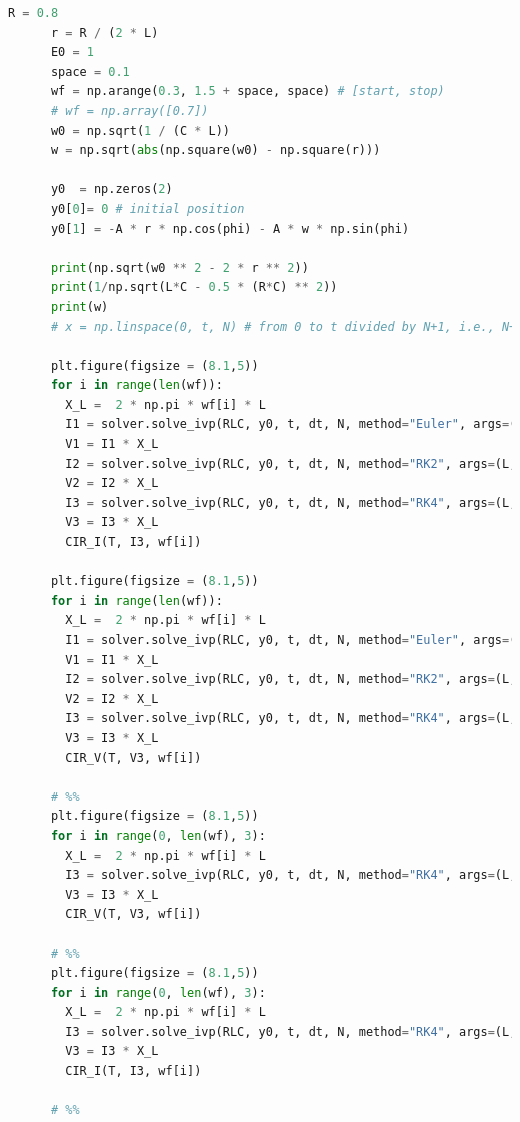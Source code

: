 \documentclass[12pt]{article}
\begin{document}
\begin{lstlisting}[language={Python}]
      R = 0.8
      r = R / (2 * L)
      E0 = 1
      space = 0.1
      wf = np.arange(0.3, 1.5 + space, space) # [start, stop)
      # wf = np.array([0.7])
      w0 = np.sqrt(1 / (C * L))
      w = np.sqrt(abs(np.square(w0) - np.square(r)))

      y0  = np.zeros(2)
      y0[0]= 0 # initial position
      y0[1] = -A * r * np.cos(phi) - A * w * np.sin(phi)

      print(np.sqrt(w0 ** 2 - 2 * r ** 2))
      print(1/np.sqrt(L*C - 0.5 * (R*C) ** 2))
      print(w)
      # x = np.linspace(0, t, N) # from 0 to t divided by N+1, i.e., N+1 equal parts.

      plt.figure(figsize = (8.1,5))
      for i in range(len(wf)):
        X_L =  2 * np.pi * wf[i] * L
        I1 = solver.solve_ivp(RLC, y0, t, dt, N, method="Euler", args=(L, R, C, wf[i], E0))[1]
        V1 = I1 * X_L
        I2 = solver.solve_ivp(RLC, y0, t, dt, N, method="RK2", args=(L, R, C, wf[i], E0))[1]
        V2 = I2 * X_L
        I3 = solver.solve_ivp(RLC, y0, t, dt, N, method="RK4", args=(L, R, C, wf[i], E0))[1]
        V3 = I3 * X_L
        CIR_I(T, I3, wf[i])
        
      plt.figure(figsize = (8.1,5))
      for i in range(len(wf)):
        X_L =  2 * np.pi * wf[i] * L
        I1 = solver.solve_ivp(RLC, y0, t, dt, N, method="Euler", args=(L, R, C, wf[i], E0))[1]
        V1 = I1 * X_L
        I2 = solver.solve_ivp(RLC, y0, t, dt, N, method="RK2", args=(L, R, C, wf[i], E0))[1]
        V2 = I2 * X_L
        I3 = solver.solve_ivp(RLC, y0, t, dt, N, method="RK4", args=(L, R, C, wf[i], E0))[1]
        V3 = I3 * X_L
        CIR_V(T, V3, wf[i])

      # %%
      plt.figure(figsize = (8.1,5))
      for i in range(0, len(wf), 3):
        X_L =  2 * np.pi * wf[i] * L
        I3 = solver.solve_ivp(RLC, y0, t, dt, N, method="RK4", args=(L, R, C, wf[i], E0))[1]
        V3 = I3 * X_L
        CIR_V(T, V3, wf[i])

      # %%
      plt.figure(figsize = (8.1,5))
      for i in range(0, len(wf), 3):
        X_L =  2 * np.pi * wf[i] * L
        I3 = solver.solve_ivp(RLC, y0, t, dt, N, method="RK4", args=(L, R, C, wf[i], E0))[1]
        V3 = I3 * X_L
        CIR_I(T, I3, wf[i])

      # %%
      \end{lstlisting}
\end{document}
